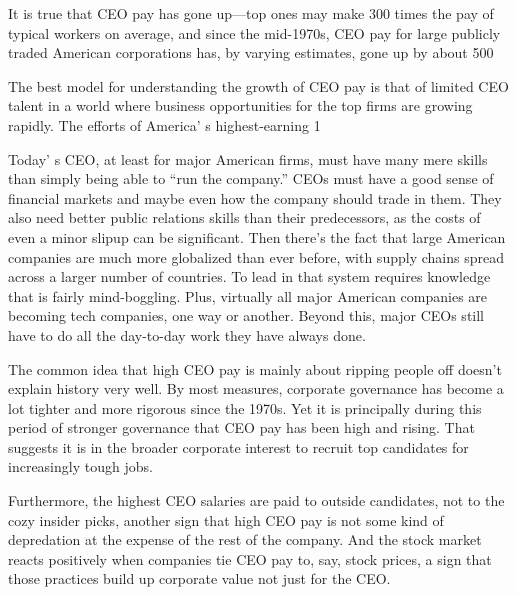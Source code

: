 It is true that CEO pay has gone up—top ones may make 300 times the pay of typical workers on average, and since the mid-1970s, CEO pay for large publicly traded American corporations has, by varying estimates, gone up by about 500%


The best model for understanding the growth of CEO pay is that of limited CEO talent in a world where business opportunities for the top firms are growing rapidly. The efforts of America' s highest-earning 1%


Today' s CEO, at least for major American firms, must have many mere skills than simply being able to ``run the company.'' CEOs must have a good sense of financial markets and maybe even how the company should trade in them. They also need better public relations skills than their predecessors, as the costs of even a minor slipup can be significant. Then there's the fact that large American companies are much more globalized than ever before, with supply chains spread across a larger number of countries. To lead in that system requires knowledge that is fairly mind-boggling. Plus, virtually all major American companies are becoming tech companies, one way or another. Beyond this, major CEOs still have to do all the day-to-day work they have always done.


The common idea that high CEO pay is mainly about ripping people off doesn't explain history very well. By most measures, corporate governance has become a lot tighter and more rigorous since the 1970s. Yet it is principally during this period of stronger governance that CEO pay has been high and rising. That suggests it is in the broader corporate interest to recruit top candidates for increasingly tough jobs.


Furthermore, the highest CEO salaries are paid to outside candidates, not to the cozy insider picks, another sign that high CEO pay is not some kind of depredation at the expense of the rest of the company. And the stock market reacts positively when companies tie CEO pay to, say, stock prices, a sign that those practices build up corporate value not just for the CEO.
